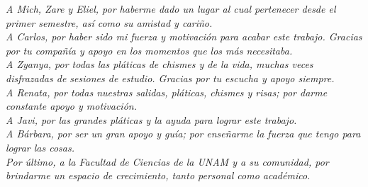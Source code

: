 \textit{A Mich, Zare y Eliel, por haberme dado un lugar al cual pertenecer desde
el primer semestre, as\'i como su amistad y cari\~{n}o.}\\

\textit{A Carlos, por haber sido mi fuerza y motivaci\'on para acabar este
trabajo. Gracias por tu compa\~{n}\'ia y apoyo en los momentos que los m\'as
necesitaba.}\\

\textit{A Zyanya, por todas las pl\'aticas de chismes y de la vida, muchas veces
disfrazadas de sesiones de estudio. Gracias por tu escucha y apoyo siempre.}\\

\textit{A Renata, por todas nuestras salidas, pl\'aticas, chismes y risas; por
darme constante apoyo y motivaci\'on.}\\

\textit{A Javi, por las grandes pl\'aticas y la ayuda para lograr este trabajo.}\\

\textit{A B\'arbara, por ser un gran apoyo y gu\'ia; por ense\~{n}arme la fuerza
que tengo para lograr las cosas.}\\

\textit{Por \'ultimo, a la Facultad de Ciencias de la UNAM y a su comunidad, por
brindarme un espacio de crecimiento, tanto personal como acad\'emico.}